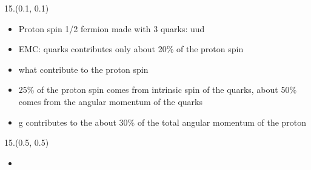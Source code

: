 \documentclass[8pt, xcolor={dvipsnames}, sans, mathserif]{beamer}
\newenvironment{List}[2]
{\begin{textblock}{#1}#2
\begin{itemize}}
{\end{itemize}
\end{textblock}}
\begin{document}
\begin{frame}
\begin{List}{15.}{(0.1, 0.1)}

  \item Proton spin 1/2 fermion made with 3 quarks: uud

  \item EMC: quarks contributes only about 20\% of the proton spin

  \item what contribute to the proton spin

  \item 25\% of the proton spin comes from intrinsic spin of the quarks, about 50\% comes from the angular momentum of the quarks

  \item g contributes to the about 30\% of the total angular momentum of the proton

\end{List}
\end{frame}

\begin{frame}
\begin{List}{15.}{(0.5, 0.5)}

  \item

\end{List}
\end{frame}
\end{document}
